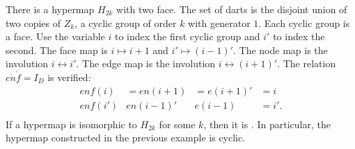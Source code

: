 \begin{example}[cyclic]\label{ex:H2k} 
There is a hypermap $H_{2k}$ with two face.  The set of darts is the
disjoint union of two copies of $Z_k$, a cyclic group of order $k$
with generator $1$.  Each cyclic group is a face.  Use the variable
$i$ to index the first cyclic group and $i'$ to index the second.
The face map is $i\mapsto i+1$ and $i'\mapsto (i-1)'$.  The node map
is the involution $i\leftrightarrow i'$.  The edge map is the
involution $i\leftrightarrow (i+1)'$.  The relation $e\ocirc n\ocirc
f = I_D$ is verified:
\begin{displaymath}
\begin{array}{llllllll}
enf(i) &= e n(i+1) &= e(i+1)' &= i\\
e n f (i') & e n (i-1)' & e (i-1) &= i'.\\
\end{array}
\end{displaymath}
If a hypermap is isomorphic to $H_{2k}$ for
some $k$, then it is .  In particular,
the hypermap constructed in the previous example is cyclic.
%
%
\end{example}


%
%
%


